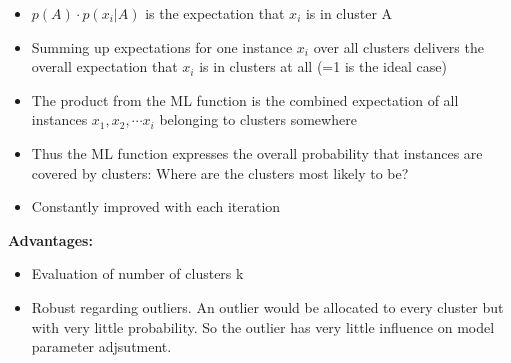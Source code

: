 \begin{breakbox}
\begin{itemize}
	\item $p(A) \cdot p(x_i|A)$ is the expectation that $x_i$ is in cluster A
	\item Summing up expectations for one instance $x_i$ over all clusters delivers the overall expectation that $x_i$ is in clusters at all (=1 is the ideal case)
	\item The product from the ML function is the combined expectation of all instances $x_1, x_2, \cdots x_i$ belonging to clusters somewhere
	\item Thus the ML function expresses the overall probability that instances are covered by clusters: Where are the clusters most likely to be?
	\item Constantly improved with each iteration
\end{itemize}

\textbf{Advantages:}
\begin{itemize}
	\item Evaluation of number of clusters k
	\item Robust regarding outliers. An outlier would be allocated to every cluster but with very little probability. So the outlier has very little influence on model parameter adjsutment.
\end{itemize}
\end{breakbox}


\begin{breakbox}
\end{breakbox}